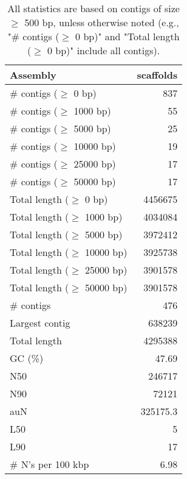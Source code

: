 \documentclass[12pt,a4paper]{article}
\begin{document}
\begin{table}[ht]
\begin{center}
\caption{All statistics are based on contigs of size $\geq$ 500 bp, unless otherwise noted (e.g., "\# contigs ($\geq$ 0 bp)" and "Total length ($\geq$ 0 bp)" include all contigs).}
\begin{tabular}{|l*{1}{|r}|}
\hline
Assembly & scaffolds \\ \hline
\# contigs ($\geq$ 0 bp) & 837 \\ \hline
\# contigs ($\geq$ 1000 bp) & 55 \\ \hline
\# contigs ($\geq$ 5000 bp) & 25 \\ \hline
\# contigs ($\geq$ 10000 bp) & 19 \\ \hline
\# contigs ($\geq$ 25000 bp) & 17 \\ \hline
\# contigs ($\geq$ 50000 bp) & 17 \\ \hline
Total length ($\geq$ 0 bp) & 4456675 \\ \hline
Total length ($\geq$ 1000 bp) & 4034084 \\ \hline
Total length ($\geq$ 5000 bp) & 3972412 \\ \hline
Total length ($\geq$ 10000 bp) & 3925738 \\ \hline
Total length ($\geq$ 25000 bp) & 3901578 \\ \hline
Total length ($\geq$ 50000 bp) & 3901578 \\ \hline
\# contigs & 476 \\ \hline
Largest contig & 638239 \\ \hline
Total length & 4295388 \\ \hline
GC (\%) & 47.69 \\ \hline
N50 & 246717 \\ \hline
N90 & 72121 \\ \hline
auN & 325175.3 \\ \hline
L50 & 5 \\ \hline
L90 & 17 \\ \hline
\# N's per 100 kbp & 6.98 \\ \hline
\end{tabular}
\end{center}
\end{table}
\end{document}
